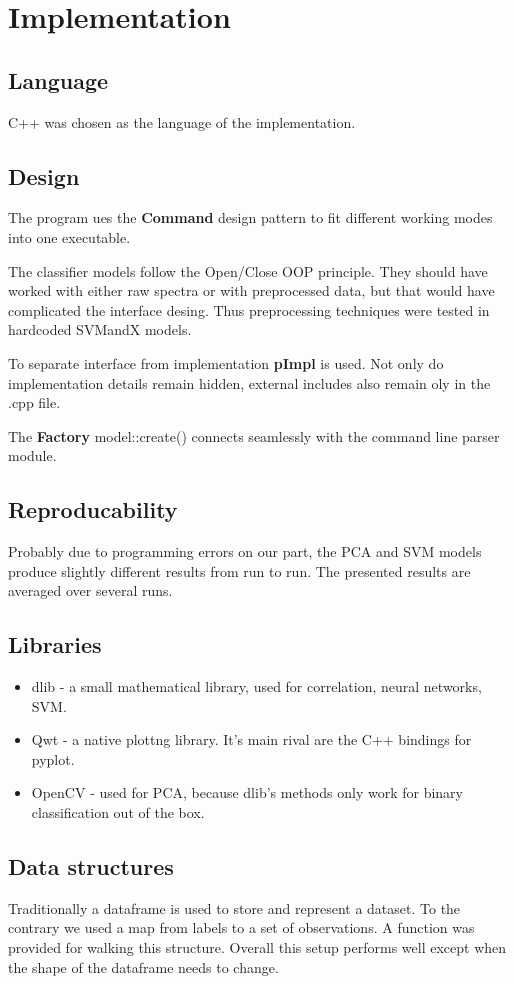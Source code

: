 \documentclass{article}
\begin{document}
\section{Implementation}
\subsection{Language}
C++ was chosen as the language of the implementation.


\subsection{Design}
The program ues the \textbf{Command} design pattern to fit different working modes into one executable.

The classifier models follow the Open/Close OOP principle.
They should have worked with either raw spectra or with preprocessed data, but that would have complicated the interface desing.
Thus preprocessing techniques were tested in hardcoded SVMandX models.

To separate interface from implementation \textbf{pImpl} is used.
Not only do implementation details remain hidden, external includes also remain oly in the .cpp file.

The \textbf{Factory} model::create() connects seamlessly with the command line parser module.

\subsection{Reproducability}
Probably due to programming errors on our part, the PCA and SVM models produce slightly different results from run to run.
The presented results are averaged over several runs.

\subsection{Libraries}
\begin{itemize}
\item{dlib - a small mathematical library, used for correlation, neural networks, SVM.}
\item{Qwt - a native plottng library. It's main rival are the C++ bindings for pyplot.}
\item{OpenCV - used for PCA, because dlib's methods only work for binary classification out of the box.}
\end{itemize}

\subsection{Data structures}
Traditionally a dataframe is used to store and represent a dataset.
To the contrary we used a map from labels to a set of observations.
A function was provided for walking this structure.
Overall this setup performs well except when the shape of the dataframe needs to change.
\end{document}
